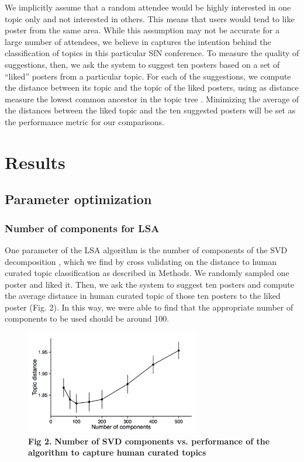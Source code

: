 \documentclass[a4paper]{article}
\begin{document}
We implicitly assume that a random attendee would be highly interested in one topic only and not interested in others. This means that users would tend to like poster from the same area. While this assumption may not be accurate for a large number of attendees, we believe in captures the intention behind the classification of topics in this particular SfN conference. To measure the quality of suggestions, then, we ask the system to suggest ten posters based on a set of “liked” posters from a particular topic. For each of the suggestions, we compute the distance between its topic and the topic of the liked posters, using as distance measure the lowest common ancestor in the topic tree \cite{aho1976finding}. Minimizing the average of the distances between the liked topic and the ten suggested posters will be set as the performance metric for our comparisons.

\section{Results}

\subsection{Parameter optimization}

\subsubsection*{Number of components for LSA}

One parameter of the LSA algorithm is the number of components of the SVD decomposition \cite{bishop2006pattern}, which we find by cross validating on the distance to human curated topic classification as described in Methods. We randomly sampled one poster and liked it. Then, we ask the system to suggest ten posters and compute the average distance in human curated topic of those ten posters to the liked poster (Fig. 2). In this way, we were able to find that the appropriate number of components to be used should be around 100.


\begin{figure}[!ht]
\centering
\includegraphics[width=3in]{performance_vs_components}
\caption*{\textbf{Fig 2.} \textbf{Number of SVD components vs. performance of the algorithm to capture human curated topics}}
\end{figure}
\end{document}
